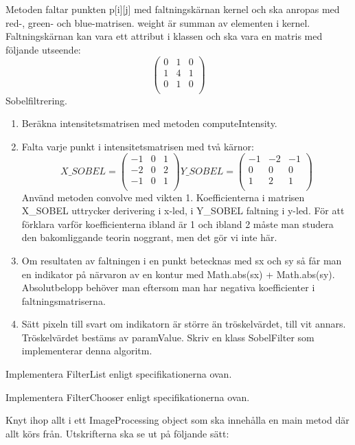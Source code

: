 Metoden faltar punkten p[i][j] med faltningskärnan kernel och ska anropas med red-, green- och blue-matrisen. weight är summan av elementen i kernel. Faltningskärnan kan vara ett attribut i klassen och ska vara en matris med följande utseende:
$$
\begin{pmatrix}
  0 & 1 & 0 \\
  1 & 4 & 1 \\
  0 & 1 & 0 \\
\end{pmatrix}
$$
\Task Sobelfiltrering.
\begin{enumerate} 
	\item Beräkna intensitetsmatrisen med metoden computeIntensity.
	\item Falta varje punkt i intensitetsmatrisen med två kärnor:
$$
X\_SOBEL =
\begin{pmatrix}
  -1 & 0 & 1 \\
  -2 & 0 & 2 \\
  -1 & 0 & 1 \\
\end{pmatrix}
Y\_SOBEL =
\begin{pmatrix}
  -1 & -2 & -1 \\
  0 & 0 & 0 \\
  1 & 2 & 1 \\
\end{pmatrix}
$$
	Använd metoden convolve med vikten 1. Koefficienterna i matrisen X\_SOBEL uttrycker derivering i x-led, i Y\_SOBEL faltning i y-led. För att förklara varför koefficienterna ibland är 1 och ibland 2 måste man studera den bakomliggande teorin noggrant, men det gör vi inte här.
	\item Om resultaten av faltningen i en punkt betecknas med sx och sy så får man en indikator på närvaron av en kontur med Math.abs(sx) + Math.abs(sy). Absolutbelopp behöver man eftersom man har negativa koefficienter i faltningsmatriserna. 
	\item  Sätt pixeln till svart om indikatorn är större än tröskelvärdet, till vit annars. Tröskelvärdet bestäms av paramValue. Skriv en klass SobelFilter som implementerar denna algoritm.
\end{enumerate}

\Task Implementera FilterList enligt specifikationerna ovan.

\Task Implementera FilterChooser enligt specifikationerna ovan.

\Task Knyt ihop allt i ett ImageProcessing object som ska innehålla en main metod där allt körs från. Utskrifterna ska se ut på följande sätt:

